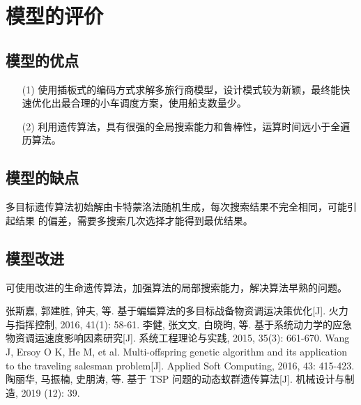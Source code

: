 \documentclass{whutmod}
\begin{document}
  \section{模型的评价}
  \subsection{模型的优点}
  \begin{itemize}                                             
  	\item [(1)]使用插板式的编码方式求解多旅行商模型，设计模式较为新颖，最终能快速优化出最合理的小车调度方案，使用船支数量少。
  	
  	\item [(2)] 利用遗传算法，具有很强的全局搜索能力和鲁棒性，运算时间远小于全遍历算法。	
  \end{itemize}
  \subsection{模型的缺点}
  
多目标遗传算法初始解由卡特蒙洛法随机生成，每次搜索结果不完全相同，可能引起结果 的偏差，需要多搜索几次选择才能得到最优结果。

  \subsection{模型改进}
  
可使用改进的生命遗传算法，加强算法的局部搜索能力，解决算法早熟的问题。

  
  
  
 
	\newpage	%
	\nocite{*}		%
%
%	
\begin{thebibliography}{9}%
	张斯嘉, 郭建胜, 钟夫, 等. 基于蝙蝠算法的多目标战备物资调运决策优化[J]. 火力与指挥控制, 2016, 41(1): 58-61.
	李健, 张文文, 白晓昀, 等. 基于系统动力学的应急物资调运速度影响因素研究[J]. 系统工程理论与实践, 2015, 35(3): 661-670.	
	Wang J, Ersoy O K, He M, et al. Multi-offspring genetic algorithm and its application to the traveling salesman problem[J]. Applied Soft Computing, 2016, 43: 415-423.
	陶丽华, 马振楠, 史朋涛, 等. 基于 TSP 问题的动态蚁群遗传算法[J]. 机械设计与制造, 2019 (12): 39.
\end{thebibliography}
\end{document}
